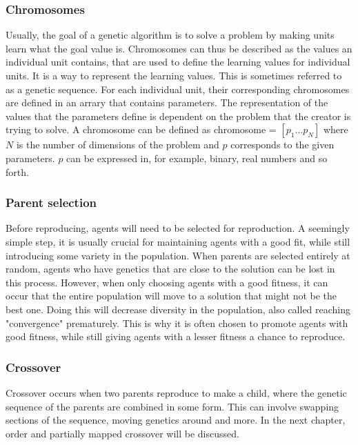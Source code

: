 \documentclass{article}
\begin{document}
\bigbreak
\subsubsection{Chromosomes}
Usually, the goal of a genetic algorithm is to solve a problem by making units learn what the goal value is. Chromosomes can thus be described as the values an individual unit contains, that are used to define the learning values for individual units. It is a way to represent the learning values. This is sometimes referred to as a genetic sequence.
\smallbreak For each individual unit, their corresponding chromosomes are defined in an arrary that contains parameters. The representation of the values that the parameters define is dependent on the problem that the creator is trying to solve. A chromosome can be defined as chromosome = $\left[ p_{1} ... p_{N} \right]$ where $N$ is the number of dimensions of the problem and $p$ corresponds to the given parameters. $p$ can be expressed in, for example, binary, real numbers and so forth.


\bigbreak
\subsubsection{Parent selection}
Before reproducing, agents will need to be selected for reproduction. A seemingly simple step, it is usually crucial for maintaining agents with a good fit, while still introducing some variety in the population. When parents are selected entirely at random, agents who have genetics that are close to the solution can be lost in this process. However, when only choosing agents with a good fitness, it can occur that the entire population will move to a solution that might not be the best one. Doing this will decrease diversity in the population, also called reaching "convergence" prematurely. This is why it is often chosen to promote agents with good fitness, while still giving agents with a lesser fitness a chance to reproduce.

\bigbreak
\subsubsection{Crossover}
Crossover occurs when two parents reproduce to make a child, where the genetic sequence of the parents are combined in some form. This can involve swapping sections of the sequence, moving genetics around and more. In the next chapter, order and partially mapped crossover will be discussed.

\bigbreak
\end{document}
